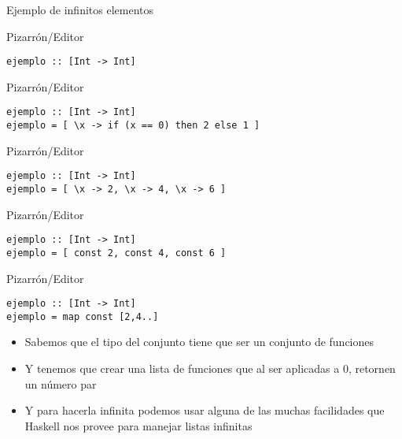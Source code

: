 \documentclass[pdf]{beamer}
\begin{document}
\begin{frame}[fragile]{Ejemplo de infinitos elementos}


\begin{overprint}
    
\begin{block}{Pizarrón/Editor}
\begin{verbatim}
ejemplo :: [Int -> Int]

\end{verbatim}
\end{block}

\begin{block}{Pizarrón/Editor}
\begin{verbatim}
ejemplo :: [Int -> Int]
ejemplo = [ \x -> if (x == 0) then 2 else 1 ]
\end{verbatim}
\end{block}

\begin{block}{Pizarrón/Editor}
\begin{verbatim}
ejemplo :: [Int -> Int]
ejemplo = [ \x -> 2, \x -> 4, \x -> 6 ]
\end{verbatim}
\end{block}

\begin{block}{Pizarrón/Editor}
\begin{verbatim}
ejemplo :: [Int -> Int]
ejemplo = [ const 2, const 4, const 6 ]
\end{verbatim}
\end{block}

\begin{block}{Pizarrón/Editor}
\begin{verbatim}
ejemplo :: [Int -> Int]
ejemplo = map const [2,4..]
\end{verbatim}
\end{block}

\end{overprint}

\begin{itemize}
    \item<1-> Sabemos que el tipo del conjunto tiene que ser un conjunto de funciones
    \item<2-> Y tenemos que crear una lista de funciones que al ser aplicadas a 0, retornen un número par
    \item<5-> Y para hacerla infinita podemos usar alguna de las muchas facilidades que Haskell
    nos provee para manejar listas infinitas
\end{itemize}


\end{frame}
\end{document}
